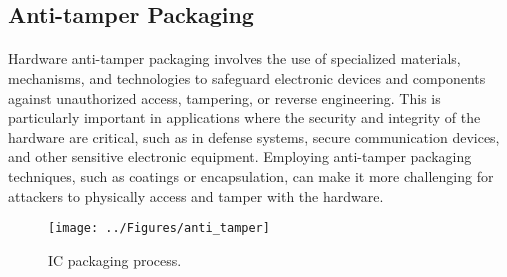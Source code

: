 \subsection{Anti-tamper Packaging}
\paragraph*{}
Hardware anti-tamper packaging involves the use of specialized materials, mechanisms, and technologies to safeguard electronic devices and components against unauthorized access, tampering, or reverse engineering. This is particularly important in applications where the security and integrity of the hardware are critical, such as in defense systems, secure communication devices, and other sensitive electronic equipment. Employing anti-tamper packaging techniques, such as coatings or encapsulation, can make it more challenging for attackers to physically access and tamper with the hardware.
\begin{figure}[h]
	\centering
	\texttt{[image: ../Figures/anti\_tamper]}
	\caption{IC packaging process.}
	\label{fig:antitamper}
\end{figure}
 
